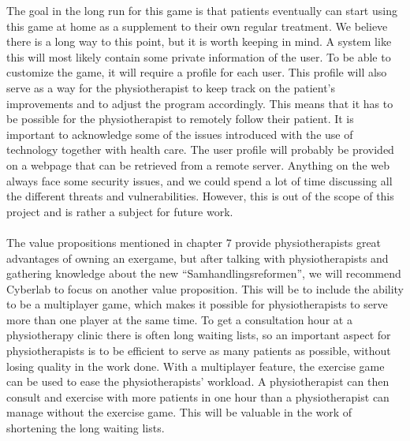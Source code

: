 The goal in the long run for this game is that patients eventually can start using this game at home as a supplement to their own regular treatment. We believe there is a long way to this point, but it is worth keeping in mind. A system like this will most likely contain some private information of the user. To be able to customize the game, it will require a profile for each user. This profile will also serve as a way for the physiotherapist to keep track on the patient’s improvements and to adjust the program accordingly. This means that it has to be possible for the physiotherapist to remotely follow their patient. It is important to acknowledge some of the issues introduced with the use of technology together with health care. The user profile will probably be provided on a webpage that can be retrieved from a remote server. Anything on the web always face some security issues, and we could spend a lot of time discussing all the different threats and vulnerabilities. However, this is out of the scope of this project and is rather a subject for future work. \\ \\ 
The value propositions mentioned in chapter 7 provide physiotherapists great advantages of owning an exergame, but after talking with physiotherapists and gathering knowledge about the new “Samhandlingsreformen”, we will recommend Cyberlab to focus on another value proposition. This will be to include the ability to be a multiplayer game, which makes it possible for physiotherapists to serve more than one player at the same time. To get a consultation hour at a physiotherapy clinic there is often long waiting lists, so an important aspect for physiotherapists is to be efficient to serve as many patients as possible, without losing quality in the work done. With a multiplayer feature, the exercise game can be used to ease the physiotherapists’ workload. A physiotherapist can then consult and exercise with more patients in one hour than a physiotherapist can manage without the exercise game. This will be valuable in the work of shortening the long waiting lists. \\ \\
